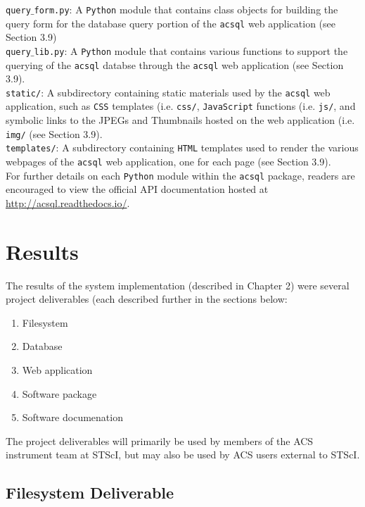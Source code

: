 \documentclass[10pt,journal,compsoc]{IEEEtran}
\begin{document}
\noindent\texttt{query$\_$form.py}: A \texttt{Python} module that contains class objects for building the query form for the database
query portion of the \texttt{acsql} web application (see Section 3.9)\\

\noindent\texttt{query$\_$lib.py}: A \texttt{Python} module that contains various functions to support the querying of the \texttt{acsql}
databse through the \texttt{acsql} web application (see Section 3.9).\\

\noindent\texttt{static/}: A subdirectory containing static materials used by the \texttt{acsql} web application, such as \texttt{CSS}
templates (i.e. \texttt{css/}, \texttt{JavaScript} functions (i.e. \texttt{js/}, and symbolic links to the JPEGs and Thumbnails hosted
on the web application (i.e. \texttt{img/} (see Section 3.9).\\

\noindent\texttt{templates/}: A subdirectory containing \texttt{HTML} templates used to render the various webpages of the \texttt{acsql}
web application, one for each page (see Section 3.9).\\

For further details on each \texttt{Python} module within the \texttt{acsql} package, readers are encouraged to view the official
API documentation hosted at \url{http://acsql.readthedocs.io/}.


\section{Results}\label{sec:results}

The results of the system implementation (described in Chapter 2) were several project deliverables (each described further in the
sections below:

\begin{enumerate}
\item Filesystem
\item Database
\item Web application
\item Software package
\item Software documenation
\end{enumerate}


The project deliverables will primarily be used by members of the ACS instrument team at STScI, but may also be used
by ACS users external to STScI.

\subsection{Filesystem Deliverable}
\end{document}
